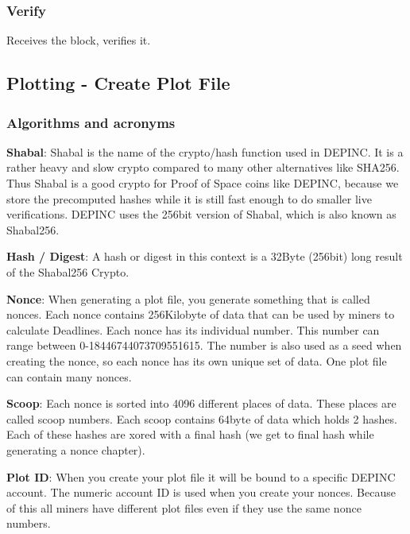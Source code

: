 \subsubsection{Verify}
\begin{flushleft}
    Receives the block, verifies it.
\end{flushleft}
\subsection{Plotting - Create Plot File}
\subsubsection{Algorithms and acronyms}
\begin{flushleft}
    \textbf{Shabal}: Shabal is the name of the crypto/hash function used in DEPINC. It is a rather heavy and slow crypto compared to many other alternatives like SHA256. Thus Shabal is a good crypto for Proof of Space coins like DEPINC, because we store the precomputed hashes while it is still fast enough to do smaller live verifications. DEPINC uses the 256bit version of Shabal, which is also known as Shabal256.
\end{flushleft}
\begin{flushleft}
    \textbf{Hash / Digest}: A hash or digest in this context is a 32Byte (256bit) long result of the Shabal256 Crypto.
\end{flushleft}
\begin{flushleft}
    \textbf{Nonce}: When generating a plot file, you generate something that is called nonces. Each nonce contains 256Kilobyte of data that can be used by miners to calculate Deadlines. Each nonce has its individual number. This number can range between 0-18446744073709551615. The number is also used as a seed when creating the nonce, so each nonce has its own unique set of data. One plot file can contain many nonces.
\end{flushleft}
\begin{flushleft}
    \textbf{Scoop}: Each nonce is sorted into 4096 different places of data. These places are called scoop numbers. Each scoop contains 64byte of data which holds 2 hashes. Each of these hashes are xored with a final hash (we get to final hash while generating a nonce chapter).
\end{flushleft}
\begin{flushleft}
    \textbf{Plot ID}: When you create your plot file it will be bound to a specific DEPINC account. The numeric account ID is used when you create your nonces. Because of this all miners have different plot files even if they use the same nonce numbers.
\end{flushleft}
